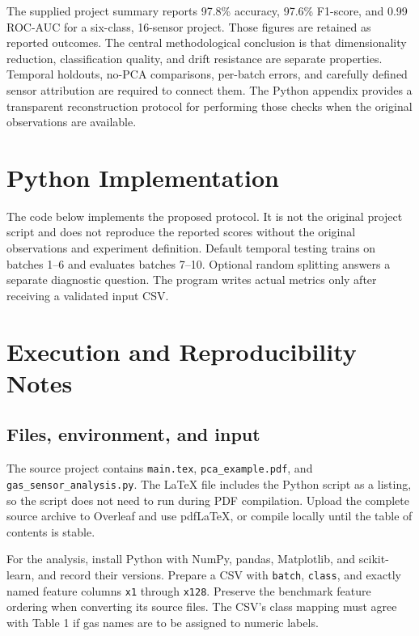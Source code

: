 \documentclass[11pt,a4paper]{article}
\begin{document}
The supplied project summary reports 97.8\% accuracy, 97.6\% F1-score, and 0.99 ROC-AUC for a six-class, 16-sensor project. Those figures are retained as reported outcomes. The central methodological conclusion is that dimensionality reduction, classification quality, and drift resistance are separate properties. Temporal holdouts, no-PCA comparisons, per-batch errors, and carefully defined sensor attribution are required to connect them. The Python appendix provides a transparent reconstruction protocol for performing those checks when the original observations are available.

\appendix\clearpage\section{Python Implementation}
The code below implements the proposed protocol. It is not the original project script and does not reproduce the reported scores without the original observations and experiment definition. Default temporal testing trains on batches 1--6 and evaluates batches 7--10. Optional random splitting answers a separate diagnostic question. The program writes actual metrics only after receiving a validated input CSV.


\clearpage\section{Execution and Reproducibility Notes}
\subsection{Files, environment, and input}
The source project contains \texttt{main.tex}, \texttt{pca\_example.pdf}, and \texttt{gas\_sensor\_analysis.py}. The LaTeX file includes the Python script as a listing, so the script does not need to run during PDF compilation. Upload the complete source archive to Overleaf and use pdfLaTeX, or compile locally until the table of contents is stable.

For the analysis, install Python with NumPy, pandas, Matplotlib, and scikit-learn, and record their versions. Prepare a CSV with \texttt{batch}, \texttt{class}, and exactly named feature columns \texttt{x1} through \texttt{x128}. Preserve the benchmark feature ordering when converting its source files. The CSV's class mapping must agree with Table 1 if gas names are to be assigned to numeric labels.
\end{document}
